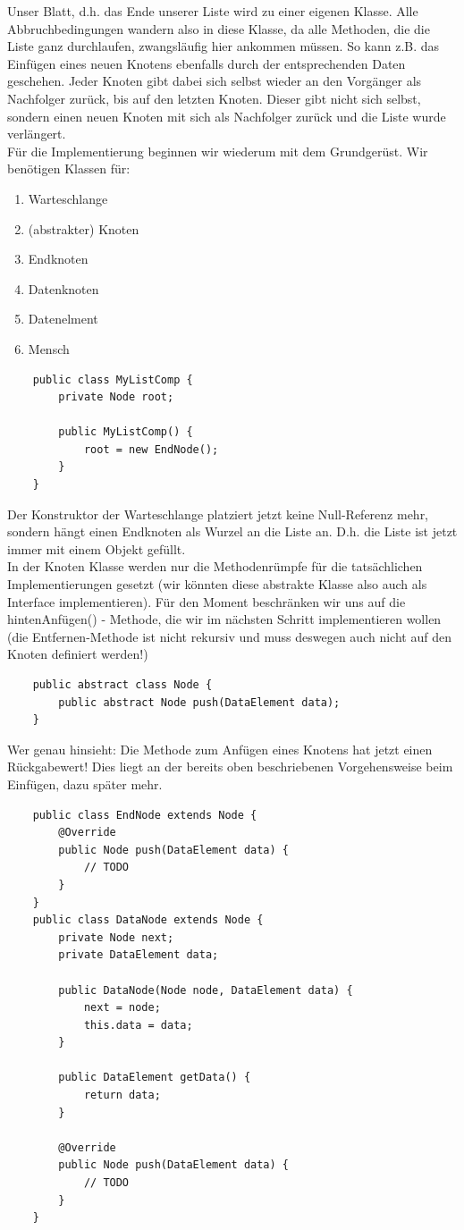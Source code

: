 \documentclass{article}
\begin{document}
Unser Blatt, d.h. das Ende unserer Liste wird zu einer eigenen Klasse. Alle Abbruchbedingungen wandern also in diese Klasse, da alle Methoden, die die Liste ganz durchlaufen, zwangsläufig hier ankommen müssen. So kann z.B. das Einfügen eines neuen Knotens ebenfalls durch  der entsprechenden Daten geschehen. Jeder Knoten gibt dabei sich selbst wieder an den Vorgänger als Nachfolger zurück, bis auf den letzten Knoten. Dieser gibt nicht sich selbst, sondern einen neuen Knoten mit sich als Nachfolger zurück und die Liste wurde verlängert. \\
Für die Implementierung beginnen wir wiederum mit dem Grundgerüst. Wir benötigen Klassen für:
\begin{enumerate}
    \item Warteschlange
    \item (abstrakter) Knoten 
    \item Endknoten
    \item Datenknoten
    \item Datenelment
    \item Mensch
\end{enumerate}
\begin{verbatim}
    public class MyListComp {
        private Node root;

        public MyListComp() {
            root = new EndNode();
        }
    }
\end{verbatim}
Der Konstruktor der Warteschlange platziert jetzt keine Null-Referenz mehr, sondern hängt einen Endknoten als Wurzel an die Liste an. D.h. die Liste ist jetzt immer mit einem  Objekt gefüllt. \\ 
In der Knoten Klasse werden nur die Methodenrümpfe für die tatsächlichen Implementierungen gesetzt (wir könnten diese abstrakte Klasse also auch als Interface implementieren). Für den Moment beschränken wir uns auf die hintenAnfügen() - Methode, die wir im nächsten Schritt implementieren wollen (die Entfernen-Methode ist nicht rekursiv und muss deswegen auch nicht auf den Knoten definiert werden!)
\begin{verbatim}
    public abstract class Node {
        public abstract Node push(DataElement data);
    }
\end{verbatim}
Wer genau hinsieht: Die Methode zum Anfügen eines Knotens hat jetzt einen Rückgabewert! Dies liegt an der bereits oben beschriebenen Vorgehensweise beim Einfügen, dazu später mehr. \\
\begin{verbatim}
    public class EndNode extends Node {
        @Override
        public Node push(DataElement data) {
            // TODO
        }
    }
    public class DataNode extends Node {
        private Node next;
        private DataElement data;

        public DataNode(Node node, DataElement data) {
            next = node;
            this.data = data;
        }

        public DataElement getData() {
            return data;
        }

        @Override
        public Node push(DataElement data) {
            // TODO
        }
    }
\end{verbatim}
\end{document}
